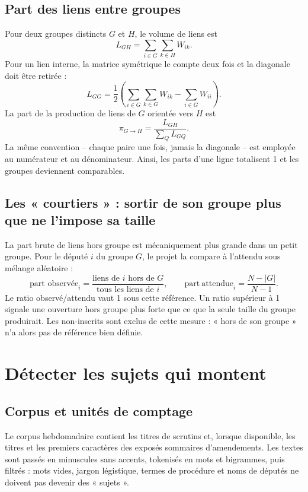 \documentclass[11pt,a4paper]{article}
\begin{document}
\subsection{Part des liens entre groupes}

Pour deux groupes distincts $G$ et $H$, le volume de liens est
\[
 L_{GH}=\sum_{i\in G}\sum_{k\in H}W_{ik}.
\]
Pour un lien interne, la matrice symétrique le compte deux fois et la diagonale
doit être retirée :
\[
 L_{GG}=\frac{1}{2}\left(\sum_{i\in G}\sum_{k\in G}W_{ik}
 -\sum_{i\in G}W_{ii}\right).
\]
La part de la production de liens de $G$ orientée vers $H$ est
\[
 \pi_{G\to H}=\frac{L_{GH}}{\sum_Q L_{GQ}}.
\]
La même convention -- chaque paire une fois, jamais la diagonale -- est
employée au numérateur et au dénominateur. Ainsi, les parts d'une ligne totalisent
1 et les groupes deviennent comparables.

\subsection{Les « courtiers » : sortir de son groupe plus que ne l'impose sa taille}

La part brute de liens hors groupe est mécaniquement plus grande dans un petit
groupe. Pour le député $i$ du groupe $G$, le projet la compare à l'attendu sous
mélange aléatoire :
\[
 \text{part observée}_i=\frac{\text{liens de $i$ hors de $G$}}
 {\text{tous les liens de $i$}},\qquad
 \mathrm{part\ attendue}_i=\frac{N-|G|}{N-1}.
\]
Le ratio observé/attendu vaut 1 sous cette référence. Un ratio supérieur à 1
signale une ouverture hors groupe plus forte que ce que la seule taille du groupe
produirait. Les non-inscrits sont exclus de cette mesure : « hors de son groupe »
n'a alors pas de référence bien définie.

\section{Détecter les sujets qui montent}\label{sec:sujets}

\subsection{Corpus et unités de comptage}

Le corpus hebdomadaire contient les titres de scrutins et, lorsque disponible,
les titres et les premiers caractères des exposés sommaires d'amendements. Les
textes sont passés en minuscules sans accents, tokenisés en mots et bigrammes,
puis filtrés : mots vides, jargon légistique, termes de procédure et noms de
députés ne doivent pas devenir des « sujets ».
\end{document}
